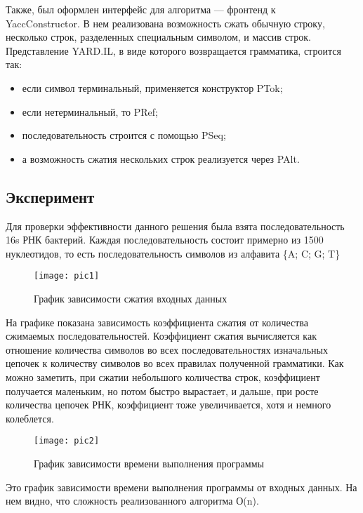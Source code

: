 \documentclass[14pt]{matmex-diploma}
\begin{document}
    Также, был оформлен интерфейс для алгоритма --- фронтенд к \\YaccConstructor. В нем реализована возможность сжать обычную строку, несколько строк, разделенных специальным символом, и массив строк. Представление YARD.IL, в виде которого возвращается грамматика, строится так:
    \begin{itemize}
        \item если символ терминальный, применяется конструктор PTok;
        \item если нетерминальный, то PRef;
        \item последовательность строится с помощью PSeq;
        \item а возможность сжатия нескольких строк реализуется через PAlt.
    \end{itemize}
    

    \subsection{Эксперимент}
    

    Для проверки эффективности данного решения была взята последовательность 16s РНК бактерий. Каждая последовательность состоит примерно из 1500 нуклеотидов, то есть последовательность символов из алфавита \{A; C; G; T\}
    \begin{figure}[h]
        \label{13} 
        \centering 
    	\texttt{[image: pic1]}
    	\caption{График зависимости сжатия входных данных}
    \end{figure}
    
    
    На графике показана зависимость коэффициента сжатия от количества сжимаемых последовательностей. Коэффициент сжатия вычисляется как отношение количества символов во всех последовательностях изначальных цепочек к количеству символов во всех правилах полученной грамматики. Как можно заметить, при сжатии небольшого количества строк, коэффициент получается маленьким, но потом быстро вырастает,  и дальше, при росте количества цепочек РНК, коэффициент тоже увеличивается, хотя и немного колеблется.
    \begin{figure}[h]
        \centering
    	\texttt{[image: pic2]}
    	\caption{График зависимости времени выполнения программы}
    \end{figure}

    Это график зависимости времени выполнения программы от входных данных. На нем видно, что сложность реализованного алгоритма О(n). 
    
\end{document}
